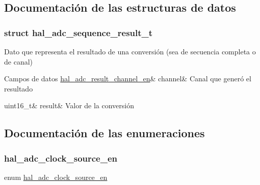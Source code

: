\subsection{Documentación de las estructuras de datos}
\label{structhal__adc__sequence__result__t}
\subsubsection{struct hal\+\_\+adc\+\_\+sequence\+\_\+result\+\_\+t}
Dato que representa el resultado de una conversión (sea de secuencia completa o de canal) \begin{DoxyFields}{Campos de datos}
\mbox{\label{group__ADC_a14b46f8d352b49c5be28cad8aafff2ba}} 
\hyperlink{group__ADC_ga99371f47be5b6b4b61c32a1ea86f2b6c}{hal\_adc\_result\_channel\_en}&
channel&
Canal que generó el resultado \\
\hline

\mbox{\label{group__ADC_a0971e3d432b7f1f283620cab047a7275}} 
uint16\_t&
result&
Valor de la conversión \\
\hline

\end{DoxyFields}


\subsection{Documentación de las enumeraciones}
\mbox{\label{group__ADC_gaee7bd99d368af2a425a9954a9e811a51}} 
\subsubsection{\texorpdfstring{hal\+\_\+adc\+\_\+clock\+\_\+source\+\_\+en}{hal\_adc\_clock\_source\_en}}
{\footnotesize\ttfamily enum \hyperlink{group__ADC_gaee7bd99d368af2a425a9954a9e811a51}{hal\+\_\+adc\+\_\+clock\+\_\+source\+\_\+en}}

